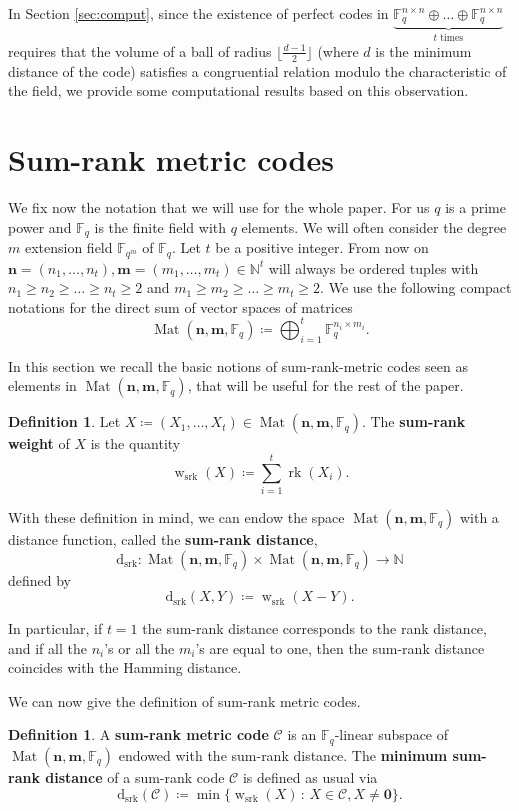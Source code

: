 \documentclass[11pt]{amsart}
\DeclareMathOperator{\C}{\mathcal{C}}
\newcommand{\srk}{\mathrm{srk}}
\newcommand{\dsrk}{\mathrm{d}_{\mathrm{srk}}}
\DeclareMathOperator{\supp}{supp}
\DeclareMathOperator{\rk}{rk}
\DeclareMathOperator{\Mat}{Mat}
\DeclareMathOperator{\ww}{w}
\theoremstyle{definition}
\newtheorem{definition}[theorem]{Definition}
\newcommand{\F}{{\mathbb F}}
\newcommand{\NN}{{\mathbb N}}
\newcommand{\bfn}{\mathbf {n}}
\newcommand{\bfm}{\mathbf {m}}
\newcommand{\Fq}{{\mathbb F}_{q}}
\newcommand{\Fm}{{\mathbb F}_{q^m}}
\newcommand{\spacmn}{\Mat(\bfn,\bfm,\F_q)}
\newcommand{\st}{\,:\,}
\begin{document}
In Section \ref{sec:comput}, since the existence of perfect codes in $\underbrace{\mathbb{F}_q^{n\times n}\oplus \ldots \oplus \F_q^{n\times n}}_{t \text{ times}}$ requires that the volume of a ball of radius $\lfloor \frac{d-1}{2} \rfloor$ (where $d$ is the minimum distance of the code) satisfies a congruential relation modulo the characteristic of the field, we provide some computational results based on this observation.  


\section{Sum-rank metric codes}\label{sec:prel}

We fix now the notation that we will use for the whole paper. For us $q$ is a prime power and $\Fq$ is the finite field with $q$ elements. We will often consider the degree $m$ extension field $\Fm$ of $\Fq$. 
\noindent Let $t$ be a positive integer. From now on
$\bfn=(n_1,\ldots,n_t), \bfm=(m_1,\ldots,m_t) \in \NN^t$ will always be ordered tuples with $n_1 \geq n_2 \geq \ldots \geq n_t\geq 2$ and $m_1 \geq m_2 \geq \ldots \geq m_t \geq 2$.
We use the following compact notations for the direct sum of vector spaces of matrices
$$ \spacmn\coloneqq \bigoplus_{i=1}^t \F_q^{n_i \times m_i}.$$

In this section we recall the basic notions of sum-rank-metric codes seen as elements in $\spacmn$, that will be useful for the rest of the paper.  

\begin{definition}
Let $X\coloneqq(X_1,\dots, X_t)\in\Mat(\mathbf{n},\mathbf{m},\Fq)$. 
The \textbf{sum-rank weight} of $X$ is the quantity
$$\ww_{\srk}(X)\coloneqq\sum_{i=1}^t \rk(X_i).$$
\end{definition}



With these definition in mind, we can endow the space $\spacmn$ with a distance function, called the \textbf{sum-rank distance},
\[
\dsrk : \spacmn \times \spacmn \longrightarrow \mathbb{N}  
\]
defined by
\[
\dsrk(X,Y) \coloneqq \ww_{\srk}(X-Y).
\]

In particular, if $t=1$ the sum-rank distance corresponds to the rank distance, and if all the $n_i$'s or all the $m_i$'s are equal to one, then the sum-rank distance coincides with the Hamming distance.

We can now give the definition of sum-rank metric codes.

\begin{definition}
 A \textbf{sum-rank metric code} $\mathcal{C}$ is an $\F_q$-linear subspace of $\spacmn$ endowed with the sum-rank distance. 
The \textbf{minimum sum-rank distance} of a sum-rank code $\mathcal{C}$ is defined as usual via $$\dsrk(\mathcal{C})\coloneqq\min\{\ww_{\srk}(X) \st X \in \mathcal{C}, X \neq \mathbf{0}\}.$$ 
\end{definition}
\end{document}
